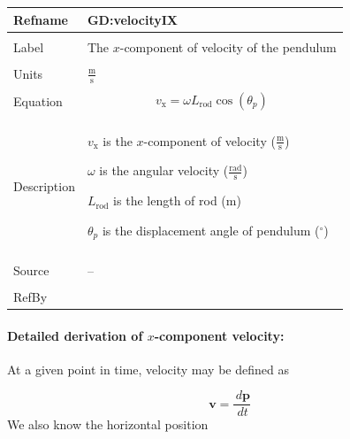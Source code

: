 \documentclass[12pt]{article}
\begin{document}
\vspace{\baselineskip}
\noindent
\begin{minipage}{\textwidth}
\begin{tabular}{>{\raggedright}p{}>{\raggedright\arraybackslash}p{}}
\toprule \textbf{Refname} & \textbf{GD:velocityIX}
\label{GD:velocityIX}
\\ \midrule \\
Label & The $x$-component of velocity of the pendulum
        
\\ \midrule \\
Units & $\frac{\text{m}}{\text{s}}$
        
\\ \midrule \\
Equation & \begin{displaymath}
           {v_{\text{x}}}=ω {L_{\text{rod}}} \cos\left({θ_{p}}\right)
           \end{displaymath}
\\ \midrule \\
Description & \begin{symbDescription}
              \item{${v_{\text{x}}}$ is the $x$-component of velocity ($\frac{\text{m}}{\text{s}}$)}
              \item{$ω$ is the angular velocity ($\frac{\text{rad}}{\text{s}}$)}
              \item{${L_{\text{rod}}}$ is the length of rod (${\text{m}}$)}
              \item{${θ_{p}}$ is the displacement angle of pendulum (${{}^{\circ}}$)}
              \end{symbDescription}
\\ \midrule \\
Source & --
         
\\ \midrule \\
RefBy & 
\\ \bottomrule
\end{tabular}
\end{minipage}
\paragraph{Detailed derivation of $x$-component velocity:}
\label{GD:velocityIXDeriv}
At a given point in time, velocity may be defined as

\begin{displaymath}
\mathbf{v}=\frac{\,d\mathbf{p}}{\,dt}
\end{displaymath}
We also know the horizontal position
\end{document}
